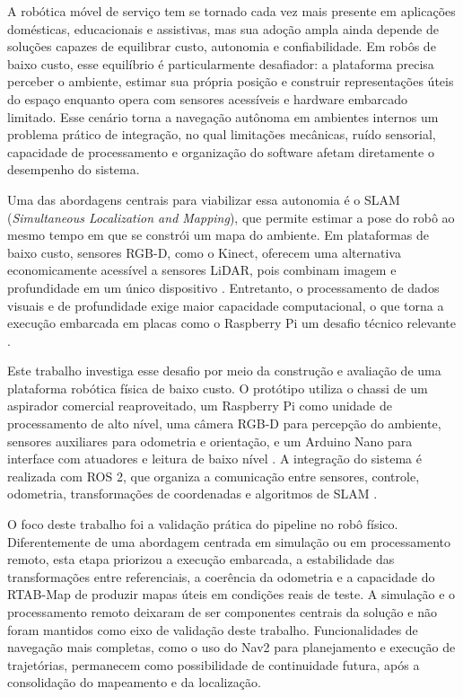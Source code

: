 A robótica móvel de serviço tem se tornado cada vez mais presente em aplicações domésticas, educacionais e assistivas, mas sua adoção ampla ainda depende de soluções capazes de equilibrar custo, autonomia e confiabilidade. Em robôs de baixo custo, esse equilíbrio é particularmente desafiador: a plataforma precisa perceber o ambiente, estimar sua própria posição e construir representações úteis do espaço enquanto opera com sensores acessíveis e hardware embarcado limitado. Esse cenário torna a navegação autônoma em ambientes internos um problema prático de integração, no qual limitações mecânicas, ruído sensorial, capacidade de processamento e organização do software afetam diretamente o desempenho do sistema.

Uma das abordagens centrais para viabilizar essa autonomia é o SLAM (\textit{Simultaneous Localization and Mapping}), que permite estimar a pose do robô ao mesmo tempo em que se constrói um mapa do ambiente. Em plataformas de baixo custo, sensores RGB-D, como o Kinect, oferecem uma alternativa economicamente acessível a sensores LiDAR, pois combinam imagem e profundidade em um único dispositivo \cite{jin2019visualslamrgbd, lemos2019plataformaroboticamovel}. Entretanto, o processamento de dados visuais e de profundidade exige maior capacidade computacional, o que torna a execução embarcada em placas como o Raspberry Pi um desafio técnico relevante \cite{raspberrypi2019raspberrypi, balado2025systematicliteraturereview}.

Este trabalho investiga esse desafio por meio da construção e avaliação de uma plataforma robótica física de baixo custo. O protótipo utiliza o chassi de um aspirador comercial reaproveitado, um Raspberry Pi como unidade de processamento de alto nível, uma câmera RGB-D para percepção do ambiente, sensores auxiliares para odometria e orientação, e um Arduino Nano para interface com atuadores e leitura de baixo nível \cite{arduino2024arduinonano}. A integração do sistema é realizada com ROS 2, que organiza a comunicação entre sensores, controle, odometria, transformações de coordenadas e algoritmos de SLAM \cite{quigley2009rosopensource}.

O foco deste trabalho foi a validação prática do pipeline no robô físico. Diferentemente de uma abordagem centrada em simulação ou em processamento remoto, esta etapa priorizou a execução embarcada, a estabilidade das transformações entre referenciais, a coerência da odometria e a capacidade do RTAB-Map de produzir mapas úteis em condições reais de teste. A simulação e o processamento remoto deixaram de ser componentes centrais da solução e não foram mantidos como eixo de validação deste trabalho. Funcionalidades de navegação mais completas, como o uso do Nav2 para planejamento e execução de trajetórias, permanecem como possibilidade de continuidade futura, após a consolidação do mapeamento e da localização.

